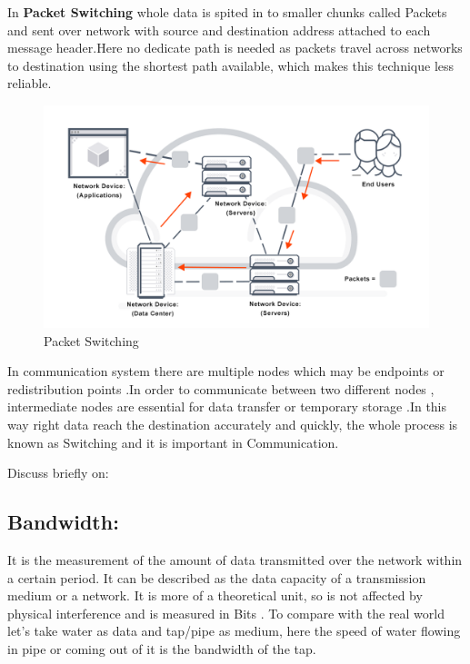 \documentclass[a4paper,12pt]{article}
\begin{document}
\begin{A}
{\begin{multicols}{2}
\begin{figure}[H]
\end{figure}
\end{multicols}
\begin{multicols}{2}
In \textbf{Packet Switching} whole data is spited in to smaller chunks called Packets and  sent over network  with source and destination address attached to each message header.Here no dedicate  path is needed as packets travel across networks to destination using the shortest path available, which makes this technique less reliable.
\columnbreak
\begin{figure}[H]
\centering
\includegraphics[scale=0.25,cframe=blue 0.5pt 3pt]{packet-switching.png} 
\caption{Packet Switching }
\end{figure}
\end{multicols}
In communication system there are multiple nodes which may be endpoints or redistribution points .In order to communicate between two different nodes , intermediate nodes are essential for data transfer or temporary storage .In this way right data reach the destination accurately and  quickly, the whole process is known as Switching and it is important in Communication.
}
\end{A}

\begin{Q}
{Discuss briefly on:}
\end{Q}
\subsection{Bandwidth:}
\begin{A}
{It is the measurement of the amount of data transmitted over the network  within a certain period. It can be described as the data  capacity of a transmission medium or a network. It is more of a theoretical unit, so is not affected by physical interference and is measured in Bits . To compare with the real world  let's take water as data and tap/pipe as medium, here the speed of water flowing in pipe or coming out of it  is the bandwidth of the tap.}

\end{A}
\end{document}
